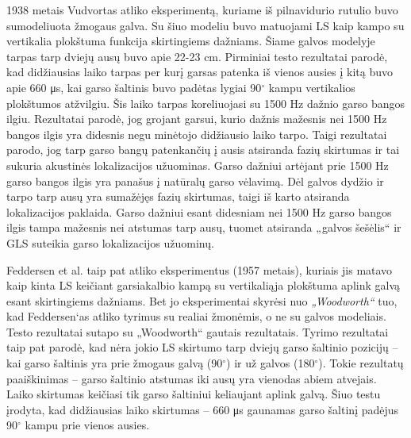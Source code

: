 \documentclass[]{vgtuef}
\begin{document}
1938 metais Vudvortas atliko eksperimentą, kuriame iš pilnavidurio rutulio buvo sumodeliuota žmogaus galva. Su šiuo modeliu buvo matuojami LS kaip kampo su vertikalia plokštuma funkcija skirtingiems dažniams. Šiame galvos modelyje tarpas tarp dviejų ausų buvo apie 22-23 cm. Pirminiai testo rezultatai parodė, kad didžiausias laiko tarpas per kurį garsas patenka iš vienos ausies į kitą buvo apie 660 μs, kai garso šaltinis buvo padėtas lygiai 90$^\circ$ kampu vertikalios plokštumos atžvilgiu. Šis laiko tarpas koreliuojasi su 1500 Hz dažnio garso bangos ilgiu. Rezultatai parodė, jog grojant garsui, kurio dažnis mažesnis nei 1500 Hz bangos ilgis yra didesnis negu minėtojo didžiausio laiko tarpo. Taigi rezultatai parodo, jog tarp garso bangų patenkančių į ausis atsiranda fazių skirtumas ir tai sukuria akustinės lokalizacijos užuominas. Garso dažniui artėjant prie 1500 Hz garso bangos ilgis yra panašus į natūralų garso vėlavimą. Dėl galvos dydžio ir tarpo tarp ausų yra sumažėjęs fazių skirtumas, taigi iš karto atsiranda lokalizacijos paklaida. Garso dažniui esant didesniam nei 1500 Hz garso bangos ilgis tampa mažesnis nei atstumas tarp ausų, tuomet atsiranda „galvos šešėlis“ ir GLS suteikia garso lokalizacijos užuominų.

Feddersen et al. taip pat atliko eksperimentus (1957 metais), kuriais jis matavo kaip kinta LS keičiant garsiakalbio kampą su vertikaliąja plokštuma aplink galvą esant skirtingiems dažniams. Bet jo eksperimentai skyrėsi nuo \textit{„Woodworth“} tuo, kad Feddersen‘as atliko tyrimus su realiai žmonėmis, o ne su galvos modeliais. Testo rezultatai sutapo su „Woodworth“ gautais rezultatais. Tyrimo rezultatai taip pat parodė, kad nėra jokio LS skirtumo tarp dviejų garso šaltinio pozicijų – kai garso šaltinis yra prie žmogaus galvą (90$^\circ$) ir už galvos (180$^\circ$). Tokie rezultatų paaiškinimas – garso šaltinio atstumas iki ausų yra vienodas abiem atvejais. Laiko skirtumas keičiasi tik garso šaltiniui keliaujant aplink galvą. Šiuo testu įrodyta, kad didžiausias laiko skirtumas – 660 μs gaunamas garso šaltinį padėjus 90$^\circ$ kampu prie vienos ausies.
\end{document}
